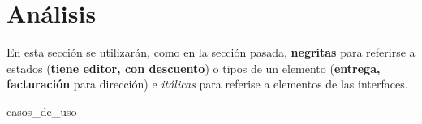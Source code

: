 %
%

\section{Análisis}

En esta sección se utilizarán, como en la sección pasada, \textbf{negritas}
para referirse a estados (\textbf{tiene editor, con descuento}) o tipos de un
elemento (\textbf{entrega, facturación} para dirección) e \textit{itálicas}
para referise a elementos de las interfaces.

{casos_de_uso}
